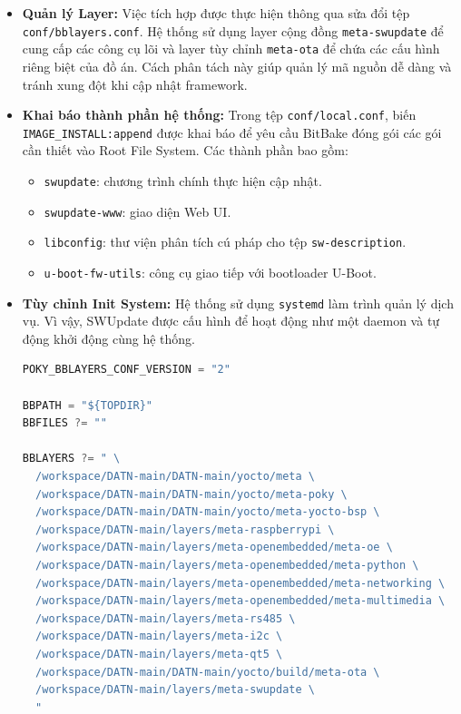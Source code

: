 \begin{itemize}
    \item \textbf{Quản lý Layer:} Việc tích hợp được thực hiện thông qua sửa đổi tệp \texttt{conf/bblayers.conf}. Hệ thống sử dụng layer cộng đồng \texttt{meta-swupdate} để cung cấp các công cụ lõi và layer tùy chỉnh \texttt{meta-ota} để chứa các cấu hình riêng biệt của đồ án. Cách phân tách này giúp quản lý mã nguồn dễ dàng và tránh xung đột khi cập nhật framework.

    \item \textbf{Khai báo thành phần hệ thống:} Trong tệp \texttt{conf/local.conf}, biến \texttt{IMAGE\_INSTALL:append} được khai báo để yêu cầu BitBake đóng gói các gói cần thiết vào Root File System. Các thành phần bao gồm:
    \begin{itemize}
        \item \texttt{swupdate}: chương trình chính thực hiện cập nhật.
        \item \texttt{swupdate-www}: giao diện Web UI.
        \item \texttt{libconfig}: thư viện phân tích cú pháp cho tệp \texttt{sw-description}.
        \item \texttt{u-boot-fw-utils}: công cụ giao tiếp với bootloader U-Boot.
    \end{itemize}

    \item \textbf{Tùy chỉnh Init System:} Hệ thống sử dụng \texttt{systemd} làm trình quản lý dịch vụ. Vì vậy, SWUpdate được cấu hình để hoạt động như một daemon và tự động khởi động cùng hệ thống.
\begin{lstlisting}[style=thesisstyle, language=C]
POKY_BBLAYERS_CONF_VERSION = "2"

BBPATH = "${TOPDIR}"
BBFILES ?= ""

BBLAYERS ?= " \
  /workspace/DATN-main/DATN-main/yocto/meta \
  /workspace/DATN-main/DATN-main/yocto/meta-poky \
  /workspace/DATN-main/DATN-main/yocto/meta-yocto-bsp \
  /workspace/DATN-main/layers/meta-raspberrypi \
  /workspace/DATN-main/layers/meta-openembedded/meta-oe \
  /workspace/DATN-main/layers/meta-openembedded/meta-python \
  /workspace/DATN-main/layers/meta-openembedded/meta-networking \
  /workspace/DATN-main/layers/meta-openembedded/meta-multimedia \
  /workspace/DATN-main/layers/meta-rs485 \
  /workspace/DATN-main/layers/meta-i2c \
  /workspace/DATN-main/layers/meta-qt5 \
  /workspace/DATN-main/DATN-main/yocto/build/meta-ota \
  /workspace/DATN-main/layers/meta-swupdate \
  "

\end{lstlisting}
\end{itemize}


